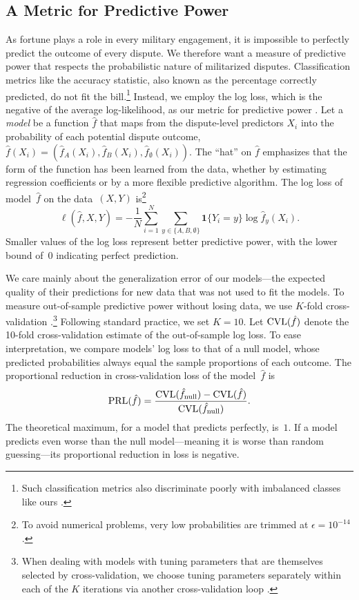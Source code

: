 \subsection{A Metric for Predictive Power}

As fortune plays a role in every military engagement, it is impossible to perfectly predict the outcome of every dispute.
We therefore want a measure of predictive power that respects the probabilistic nature of militarized disputes.
Classification metrics like the accuracy statistic, also known as the percentage correctly predicted, do not fit the bill.\footnote{%
   Such classification metrics also discriminate poorly with imbalanced classes like ours \citep[420--423]{kuhn}.
}
Instead, we employ the log loss, which is the negative of the average log-likelihood, as our metric for predictive power \citep[221]{Hastie:2009wpa}.
Let a \emph{model} be a function $\hat{f}$ that maps from the dispute-level predictors $X_i$ into the probability of each potential dispute outcome, $\hat{f}(X_i) = (\hat{f}_A(X_i), \hat{f}_B(X_i), \hat{f}_{\emptyset}(X_i))$.
The ``hat'' on $\hat{f}$ emphasizes that the form of the function has been learned from the data, whether by estimating regression coefficients or by a more flexible predictive algorithm.
The log loss of model~$\hat{f}$ on the data~$(X, Y)$ is\footnote{%
  To avoid numerical problems, very low probabilities are trimmed at $\epsilon = 10^{-14}$.
}
\begin{equation}
  \label{eq:log-loss}
  \ell(\hat{f}, X, Y)
  =
  - \frac{1}{N} \sum_{i = 1}^{N} \sum_{y \in \{A, B, \emptyset\}}
  \mathbf{1} \{Y_i = y\} \log \hat{f}_y(X_i).
\end{equation}
Smaller values of the log loss represent better predictive power, with the lower bound of~$0$ indicating perfect prediction.

We care mainly about the generalization error of our models---the expected quality of their predictions for new data that was not used to fit the models.
To measure out-of-sample predictive power without losing data, we use $K$-fold cross-validation \citep[241--249]{Hastie:2009wpa}.\footnote{%
  \label{fn:nested-cv}%
  When dealing with models with tuning parameters that are themselves selected by cross-validation, we choose tuning parameters separately within each of the $K$ iterations via another cross-validation loop \citep{Varma:2006ch}.
}
Following standard practice, we set $K = 10$.
Let $\operatorname{CVL}(\hat{f})$ denote the 10-fold cross-validation estimate of the out-of-sample log loss.
To ease interpretation, we compare models' log loss to that of a null model, whose predicted probabilities always equal the sample proportions of each outcome.
The proportional reduction in cross-validation loss of the model~$\hat{f}$ is
\begin{equation}
  \label{eq:prl}
  \operatorname{PRL}(\hat{f})
  =
  \frac{
    \operatorname{CVL}(\hat{f}_{\text{null}}) - \operatorname{CVL}(\hat{f})
  }{
    \operatorname{CVL}(\hat{f}_{\text{null}})
  }.
\end{equation}
The theoretical maximum, for a model that predicts perfectly, is~$1$.
If a model predicts even worse than the null model---meaning it is worse than random guessing---its proportional reduction in loss is negative.

